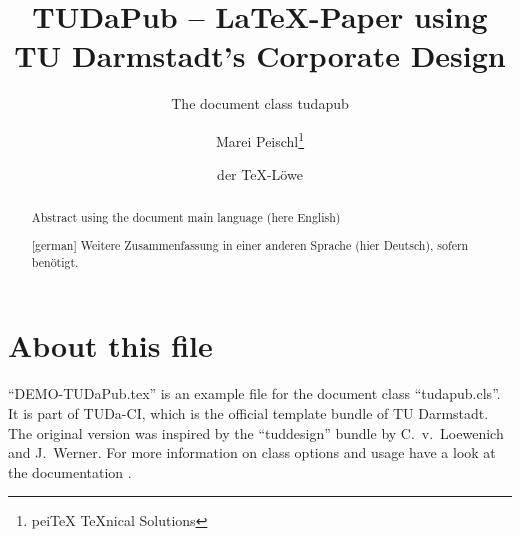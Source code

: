 \documentclass[
	english,%
	accentcolor=9c,%
	logofile=tuda_logo,%
]{tudapub}
\title{TUDaPub -- \LaTeX-Paper using TU Darmstadt's Corporate Design}
\subtitle{The document class tudapub}
\author{Marei Peischl\thanks{pei\TeX{} \TeX{}nical Solutions}\and der \TeX-Löwe}
\begin{document}
\maketitle

\begin{abstract}
	Abstract using the document main language (here English)
\end{abstract}

\begin{abstract}[german]
	Weitere Zusammenfassung in einer anderen Sprache (hier Deutsch), sofern benötigt.
\end{abstract}

\tableofcontents


\section{About this file}

\enquote{DEMO-TUDaPub.tex} is an example file for the document class \enquote{tudapub.cls}.
It is part of TUDa-CI, which is the official template bundle of TU Darmstadt. The original version was inspired by the \enquote{tuddesign} bundle by C.~v.~Loewenich and J.~Werner.
For more information on class options and usage have a look at the documentation \cite{tuda-ci}.


\printbibliography
\end{document}
